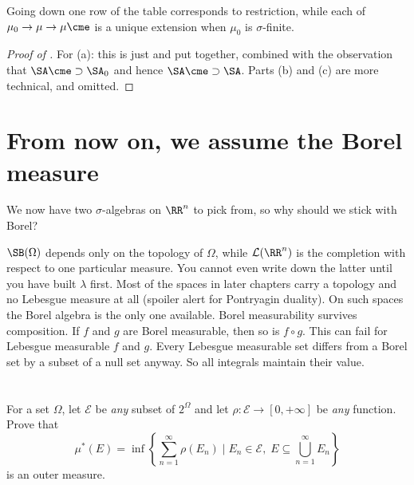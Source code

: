 Going down one row of the table corresponds to restriction,
while each of $\mu_0 \to \mu \to \mu\cme$ is a unique extension
when $\mu_0$ is $\sigma$-finite.
\begin{proof}
	[Proof of ]
	For (a): this is just  and 
	put together, combined with the observation that $\SA\cme \supset \SA_0$
	and hence $\SA\cme \supset \SA$.
	Parts (b) and (c) are more technical, and omitted.
\end{proof}

\section{From now on, we assume the Borel measure}
We now have two $\sigma$-algebras on $\RR^n$ to pick from,
so why should we stick with Borel?
\begin{itemize}
	\ii $\SB(\Omega)$ depends only on the topology of $\Omega$,
	while $\mathcal{L}(\RR^n)$ is the completion with respect to
	one particular measure.
	You cannot even write down the latter
	until you have built $\lambda$ first.
	\ii Most of the spaces in later chapters carry a topology
	and no Lebesgue measure at all (spoiler alert for Pontryagin duality).
	On such spaces the Borel algebra is the only one available.
	\ii Borel measurability survives composition.
	If $f$ and $g$ are Borel measurable, then so is $f \circ g$.
	This can fail for Lebesgue measurable $f$ and $g$.
	\ii Every Lebesgue measurable set differs from a Borel set
	by a subset of a null set anyway.
	So all integrals maintain their value.
\end{itemize}

\section{\problemhead}
\begin{dproblem}
	\label{pr:construct_outer_measure}
	For a set $\Omega$,
	let $\mathcal{E}$ be \emph{any} subset of $2^{\Omega}$
	and let $\rho \colon \mathcal{E} \to [0,+\infty]$
	be \emph{any} function.
	Prove that
	\[ \mu^\ast(E) = \inf \left\{ \sum_{n=1}^\infty \rho(E_n) \mid
		E_n \in \mathcal{E}, \;
		E \subseteq \bigcup_{n=1}^\infty E_n \right\} \]
	is an outer measure.
\end{dproblem}

